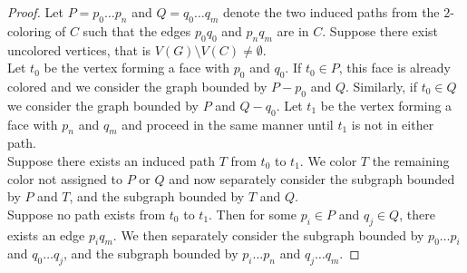 \documentclass[11pt,letter]{article}
\begin{document}
\begin{proof}
\noindent Let $P=p_0\ldots p_n$ and $Q=q_0\ldots q_m$ denote the two induced paths from the $2$-coloring of $C$
such that the edges $p_0q_0$ and $p_nq_m$ are in $C$. Suppose there exist uncolored vertices, that is
$V(G)\setminus V(C)\ne\emptyset$.\\

\noindent Let $t_0$ be the vertex forming a face with $p_0$ and $q_0$. If $t_0\in P$, this face is already
colored and we consider the graph bounded by $P-p_0$ and $Q$. Similarly, if $t_0\in Q$ we consider
the graph bounded by $P$ and $Q-q_0$. Let $t_1$ be the vertex forming a face with $p_n$ and $q_m$ and
proceed in the same manner until $t_1$ is not in either path.\\

\noindent Suppose there exists an induced path $T$ from $t_0$ to $t_1$. We color $T$ the remaining color not
assigned to $P$ or $Q$ and now separately consider the subgraph bounded by $P$ and $T$, and the subgraph bounded
by $T$ and $Q$.\\

\noindent Suppose no path exists from $t_0$ to $t_1$. Then for some $p_i\in P$ and $q_j\in Q$, there exists an
edge $p_iq_m$. We then separately consider the subgraph bounded by $p_0\ldots p_i$ and $q_0\ldots q_j$, and
the subgraph bounded by $p_i\ldots p_n$ and $q_j\ldots q_m$.
\end{proof}
\end{document}
